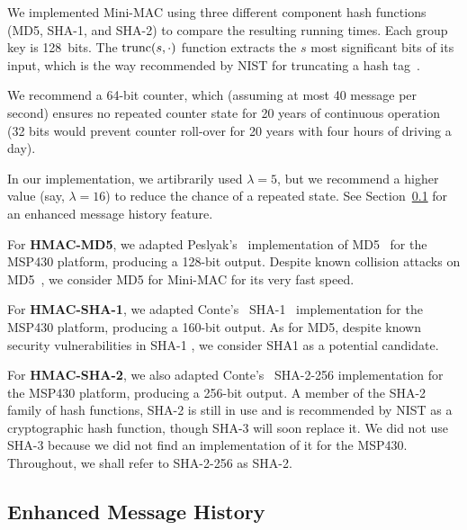 We implemented Mini-MAC using three different component hash functions (MD5, SHA-1, and SHA-2) to compare the resulting running times.  
Each group key is 128~bits.  The $\hbox{trunc}(s,\cdot)$ function extracts 
the $s$ most significant bits of its input, which is the way recommended by NIST
for truncating a hash tag~\cite{nist107}.

We recommend a 64-bit counter, which (assuming at most 40 message per second) ensures no repeated counter state for 20 years
of continuous operation (32 bits would prevent counter roll-over for 20 years with four hours of driving a day).

In our implementation, we artibrarily used $\lambda = 5$, 
but we recommend a higher value (say, $\lambda = 16$) to reduce the chance of a repeated state.
See Section~\ref{history} for an enhanced message history feature.


For \textbf{HMAC-MD5},
we adapted Peslyak's~\cite{Peslyak} implementation of MD5~\cite{MD5} for the MSP430 platform, producing a 128-bit output. 
Despite known collision attacks on MD5~\cite{Wang-MD5}, we consider
MD5 for Mini-MAC for its very fast speed.  

For \textbf{HMAC-SHA-1},
we adapted Conte's~\cite{Conte-SHA1} SHA-1~\cite{FIPS-180-4} implementation for the MSP430 platform, producing a 160-bit output. 
As for MD5, despite known security vulnerabilities in SHA-1 \cite{Wang-SHA1}, 
we consider SHA1 as a potential candidate.


For \textbf{HMAC-SHA-2},
we also adapted Conte's~\cite{Conte-SHA256} SHA-2-256 implementation for the MSP430 platform, producing a 256-bit output. 
A member of the SHA-2 family of hash functions, SHA-2 is still in use and is recommended by NIST as a cryptographic hash function, 
though SHA-3 will soon replace it\cite{FIPS-180-4}. We did not use SHA-3 because we did not find an implementation of it
for the MSP430.  Throughout, we shall refer to SHA-2-256 as SHA-2.


\subsection{Enhanced Message History}
\label{history}


